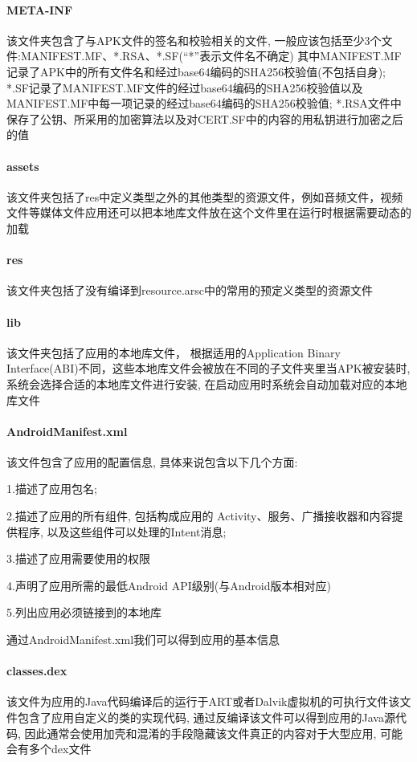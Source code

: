 \paragraph*{META-INF} 
该文件夹包含了与APK文件的签名和校验相关的文件, 一般应该包括至少3个文件:MANIFEST.MF、*.RSA、*.SF(“*”表示文件名不确定)\juhao 
其中MANIFEST.MF记录了APK中的所有文件名和经过base64编码的SHA256校验值(不包括自身);
*.SF记录了MANIFEST.MF文件的经过base64编码的SHA256校验值以及MANIFEST.MF中每一项记录的经过base64编码的SHA256校验值;
*.RSA文件中保存了公钥、所采用的加密算法以及对CERT.SF中的内容的用私钥进行加密之后的值\juhao

\paragraph*{assets} 
该文件夹包括了res中定义类型之外的其他类型的资源文件，例如音频文件，视频文件等媒体文件\juhao 应用还可以把本地库文件放在这个文件里在运行时根据需要动态的加载\juhao

\paragraph*{res}
该文件夹包括了没有编译到resource.arsc中的常用的预定义类型的资源文件\juhao 

\paragraph*{lib}
该文件夹包括了应用的本地库文件， 根据适用的Application Binary Interface(ABI)不同，这些本地库文件会被放在不同的子文件夹里\juhao 当APK被安装时, 系统会选择合适的本地库文件进行安装, 在启动应用时系统会自动加载对应的本地库文件\juhao

\paragraph*{AndroidManifest.xml}
该文件包含了应用的配置信息, 具体来说包含以下几个方面:

1.描述了应用包名;

2.描述了应用的所有组件, 包括构成应用的 Activity、服务、广播接收器和内容提供程序, 以及这些组件可以处理的Intent消息;

3.描述了应用需要使用的权限

4.声明了应用所需的最低Android API级别(与Android版本相对应)

5.列出应用必须链接到的本地库

通过AndroidManifest.xml我们可以得到应用的基本信息\juhao


\paragraph*{classes.dex}
该文件为应用的Java代码编译后的运行于ART或者Dalvik虚拟机的可执行文件\juhao 该文件包含了应用自定义的类的实现代码, 通过反编译该文件可以得到应用的Java源代码, 因此通常会使用加壳和混淆的手段隐藏该文件真正的内容\juhao 对于大型应用, 可能会有多个dex文件\juhao

